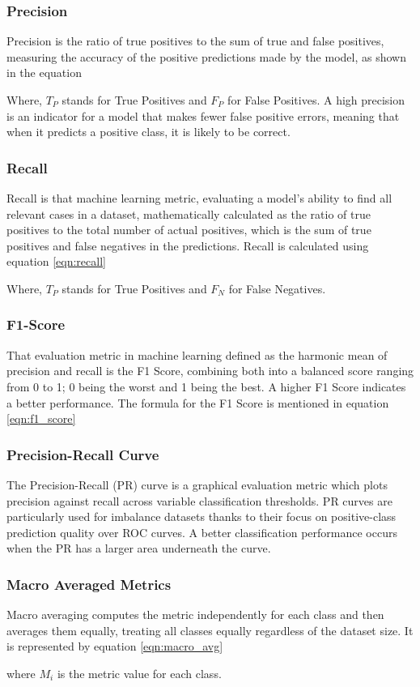 \subsubsection{Precision}
Precision is the ratio of true positives to the sum of true and false
positives, measuring the accuracy of the positive predictions made by
the model, as shown in the equation

Where, $T_P$ stands for True Positives and $F_P$ for False Positives.
A high precision is an indicator for a model that makes fewer false
positive errors, meaning that when it predicts a positive class, it
is likely to be correct.
\\
\subsubsection{Recall}
Recall is that machine learning metric, evaluating a model's ability
to find all relevant cases in a dataset, mathematically calculated as
the ratio of true positives to the total number of actual positives,
which is the sum of true positives and false negatives in the
predictions. Recall is calculated using equation \ref{eqn:recall}

Where, $T_P$ stands for True Positives and $F_N$ for False Negatives.
\\
\subsubsection{F1-Score}
That evaluation metric in machine learning defined as the harmonic
mean of precision and recall is the F1 Score, combining both into a
balanced score ranging from 0 to 1; 0 being the worst and 1 being the
best. A higher F1 Score indicates a better performance. The formula
for the F1 Score is mentioned in equation \ref{eqn:f1_score}


\subsubsection{Precision-Recall Curve}
The Precision-Recall (PR) curve is a graphical evaluation metric
which plots precision against recall across variable classification
thresholds. PR curves are particularly used for imbalance datasets
thanks to their focus on positive-class prediction quality over ROC
curves. A better classification performance occurs when the PR has a
larger area underneath the curve.

\subsubsection{Macro Averaged Metrics}
Macro averaging computes the metric independently for each class and
then averages them equally, treating all classes equally regardless
of the dataset size. It is represented by equation \ref{eqn:macro_avg}

where $M_i$ is the metric value for each class.

